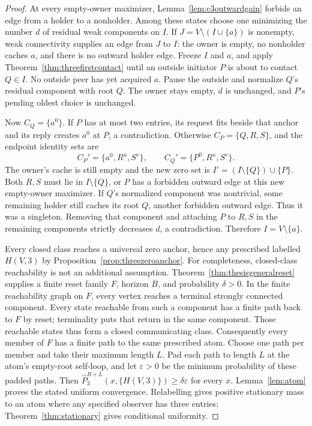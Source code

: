 \documentclass[11pt]{article}
\begin{document}
\begin{proof}
At every empty-owner maximizer, Lemma~\ref{lem:c3outwardgain}
forbids an edge from a holder to a nonholder. Among these
states choose one minimizing the number $d$ of residual weak
components on $I$. If $J=V\setminus(I\cup\{a\})$ is nonempty,
weak connectivity supplies an edge from $J$ to $I$: the owner
is empty, no nonholder caches $a$, and there is no outward
holder edge. Freeze $I$ and $a$, and apply
Theorem~\ref{thm:threefirstcontact} until an outside initiator
$P$ is about to contact $Q\in I$. No outside peer has yet
acquired $a$. Pause the outside and normalize $Q$'s residual
component with root $Q$. The owner stays empty, $d$ is unchanged,
and $P$'s pending oldest choice is unchanged.

Now $C_Q=\{a^0\}$. If $P$ has at most two entries, its request
fits beside that anchor and its reply creates $a^0$ at $P$,
a contradiction. Otherwise $C_P=\{Q,R,S\}$, and the endpoint
identity sets are
\[
 C_P'=\{a^0,R^u,S^v\},\qquad C_Q'=\{P^0,R^u,S^v\}.
\]
The owner's cache is still empty and the new zero set is
$I'=(I\setminus\{Q\})\cup\{P\}$. Both $R,S$ must lie in
$I\setminus\{Q\}$, or $P$ has a forbidden outward edge at
this new empty-owner maximizer. If $Q$'s normalized component
was nontrivial, some remaining holder still caches its root
$Q$, another forbidden outward edge. Thus it was a singleton.
Removing that component and attaching $P$ to $R,S$ in the
remaining components strictly decreases $d$, a contradiction.
Therefore $I=V\setminus\{a\}$.

Every closed class reaches a universal zero anchor, hence
any prescribed labelled $H(V,3)$ by
Proposition~\ref{prop:threezeroanchor}. For completeness,
closed-class reachability is not an additional assumption.
Theorem~\ref{thm:thesisgeneralreset} supplies a finite reset
family $F$, horizon $B$, and probability $\delta>0$.
In the finite reachability graph on $F$, every vertex reaches
a terminal strongly connected component. Every state reachable
from such a component has a finite path back to $F$ by reset;
terminality puts that return in the same component. Those
reachable states thus form a closed communicating class.
Consequently every member of $F$ has a finite path to the
same prescribed atom. Choose one path per member and take
their maximum length $L$. Pad each path to length $L$ at
the atom's empty-root self-loop, and let $\varepsilon>0$
be the minimum probability of these padded paths.
Then $\widehat P_3^{B+L}(x,\{H(V,3)\})\ge\delta\varepsilon$
for every $x$. Lemma~\ref{lem:atom} proves the stated uniform
convergence. Relabelling gives positive stationary mass to
an atom where any specified observer has three entries;
Theorem~\ref{thm:stationary} gives conditional uniformity.
\end{proof}
\end{document}
